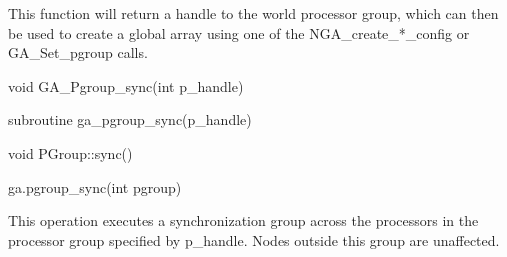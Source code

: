 \documentclass[10pt]{article}
\begin{document}
\local

\begin{desc}
This function will return a handle to the world processor group, which can then
be used to create a global array using one of the NGA_create_*_config or
GA_Set_pgroup calls.
\end{desc}



\begin{capi}
\begin{ccode}
void GA_Pgroup_sync(int p_handle)
\end{ccode}
\begin{funcargs}
\end{funcargs}
\end{capi}

\begin{fapi}
\begin{fcode}
subroutine ga_pgroup_sync(p_handle)
\end{fcode}
\begin{funcargs}
\end{funcargs}
\end{fapi}

\begin{cxxapi}
\begin{cxxcode}
void PGroup::sync()
\end{cxxcode}
\end{cxxapi}

\begin{pyapi}
\begin{pycode}
ga.pgroup_sync(int pgroup)
\end{pycode}
\begin{funcargs}
\end{funcargs}
\end{pyapi}

\gcoll

\begin{desc}
This operation executes a synchronization group across the processors in the
processor group specified by p_handle. Nodes outside this group are unaffected.
\end{desc}


\end{document}
